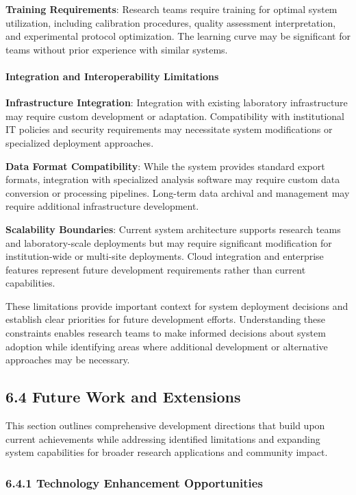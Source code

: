 \documentclass[12pt,a4paper]{article}
\begin{document}
\textbf{Training Requirements}: Research teams require training for optimal system utilization, including calibration
procedures, quality assessment interpretation, and experimental protocol optimization. The learning curve may be
significant for teams without prior experience with similar systems.

\paragraph{Integration and Interoperability Limitations}

\textbf{Infrastructure Integration}: Integration with existing laboratory infrastructure may require custom development or
adaptation. Compatibility with institutional IT policies and security requirements may necessitate system modifications
or specialized deployment approaches.

\textbf{Data Format Compatibility}: While the system provides standard export formats, integration with specialized analysis
software may require custom data conversion or processing pipelines. Long-term data archival and management may require
additional infrastructure development.

\textbf{Scalability Boundaries}: Current system architecture supports research teams and laboratory-scale deployments but may
require significant modification for institution-wide or multi-site deployments. Cloud integration and enterprise
features represent future development requirements rather than current capabilities.

These limitations provide important context for system deployment decisions and establish clear priorities for future
development efforts. Understanding these constraints enables research teams to make informed decisions about system
adoption while identifying areas where additional development or alternative approaches may be necessary.

\subsection{6.4 Future Work and Extensions}

This section outlines comprehensive development directions that build upon current achievements while addressing
identified limitations and expanding system capabilities for broader research applications and community impact.

\subsubsection{6.4.1 Technology Enhancement Opportunities}
\end{document}
